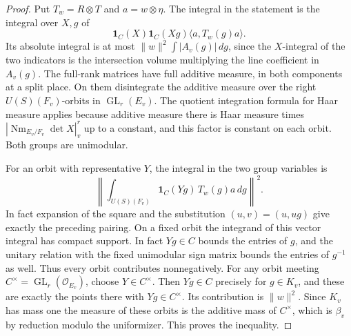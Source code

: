 \documentclass[a4paper,11pt]{article}
\theoremstyle{definition}
\theoremstyle{remark}
\numberwithin{equation}{section}
\begin{document}
\begin{proof}
Put \(T_w=R\otimes T\) and \(a=w\otimes\eta\). The
integral in the statement is the integral over \(X,g\) of
\[
  \mathbf 1_C(X)\mathbf 1_C(Xg)
                \langle a,T_w(g)a\rangle .
\]
Its absolute integral is at most
\(\|w\|^2\int |A_v(g)|\,dg\), since the \(X\)-integral
of the two indicators is the intersection volume multiplying
the line coefficient in \(A_v(g)\).
The full-rank matrices have full additive measure, in both
components at a split place. On them disintegrate the
additive measure over the right \(U(S)(F_v)\)-orbits in
\(\operatorname{GL}_r(E_v)\). The quotient integration
formula for Haar measure applies because additive measure there is Haar
measure times \(|\operatorname{Nm}_{E_v/F_v}\det X|_v^r\)
up to a constant, and this factor is constant on each orbit.
Both groups are unimodular.

For an orbit with representative \(Y\), the integral in
the two group variables is
\[
  \left\|\int_{U(S)(F_v)}\mathbf 1_C(Yg)\,T_w(g)a\,dg\right\|^2 .
\]
In fact expansion of the square and the substitution
\((u,v)=(u,ug)\) give exactly the preceding pairing.
On a fixed orbit the integrand of this vector integral
has compact support. In fact \(Yg\in C\) bounds the entries of \(g\),
and the unitary relation with the fixed unimodular sign
matrix bounds the entries of \(g^{-1}\) as well.
Thus every orbit contributes nonnegatively.
For any orbit meeting \(C^\times=\operatorname{GL}_r
(\mathcal O_{E_v})\), choose \(Y\in C^\times\).
Then \(Yg\in C\) precisely for \(g\in K_v\), and these
are exactly the points there with \(Yg\in C^\times\).
Its contribution is \(\|w\|^2\). Since \(K_v\) has
mass one the measure of these orbits is the additive
mass of \(C^\times\), which is \(\beta_v\) by reduction
modulo the uniformizer. This proves the inequality.
\end{proof}
\end{document}
